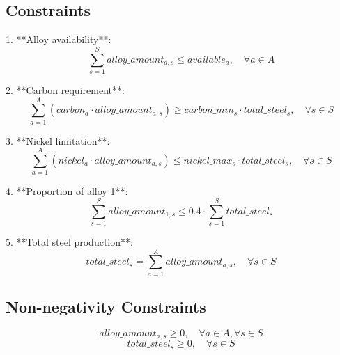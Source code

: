 \documentclass{article}
\begin{document}
\subsection*{Constraints}

1. **Alloy availability**:
\[
\sum_{s=1}^{S} alloy\_amount_{a,s} \leq available_a, \quad \forall a \in A
\]

2. **Carbon requirement**:
\[
\sum_{a=1}^{A} \left( carbon_{a} \cdot alloy\_amount_{a,s} \right) \geq carbon\_min_{s} \cdot total\_steel_{s}, \quad \forall s \in S
\]

3. **Nickel limitation**:
\[
\sum_{a=1}^{A} \left( nickel_{a} \cdot alloy\_amount_{a,s} \right) \leq nickel\_max_{s} \cdot total\_steel_{s}, \quad \forall s \in S
\]

4. **Proportion of alloy 1**:
\[
\sum_{s=1}^{S} alloy\_amount_{1,s} \leq 0.4 \cdot \sum_{s=1}^{S} total\_steel_{s}
\]

5. **Total steel production**:
\[
total\_steel_{s} = \sum_{a=1}^{A} alloy\_amount_{a,s}, \quad \forall s \in S
\]

\subsection*{Non-negativity Constraints}
\[
alloy\_amount_{a,s} \geq 0, \quad \forall a \in A, \forall s \in S
\]
\[
total\_steel_{s} \geq 0, \quad \forall s \in S
\]
\end{document}
